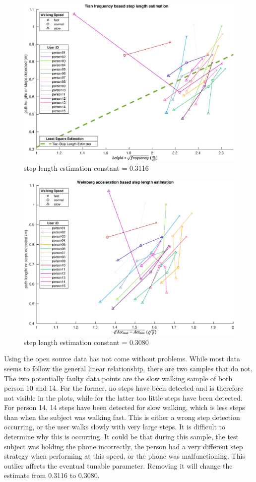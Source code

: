 	\begin{figure}[H]
	\centering
	\includegraphics[width=0.8\linewidth]{images/20201113_1634_tian}
	\caption{step length estimation constant = 0.3116}
	\label{fig:step_length_tian}
	\end{figure}
	\begin{figure}[]
		\centering
		\includegraphics[width=0.8\linewidth]{images/20201113_1639_weinberg}
		\caption{step length estimation constant = 0.3080}
		\label{fig:step_length_weinberg}
	\end{figure}

Using the open source data has not come without problems. While most data seems to follow the general linear relationship, there are two samples that do not. The two potentially faulty data points are the slow walking sample of both person 10 and 14. For the former, no steps have been detected and is therefore not visible in the plots, while for the latter too little steps have been detected. For person 14, 14 steps have been detected for slow walking, which is less steps than when the subject was walking fast. This is either a wrong step detection occurring, or the user walks slowly with very large steps. It is difficult to determine why this is occurring. It could be that during this sample, the test subject was holding the phone incorrectly, the person had a very different step strategy when performing at this speed, or the phone was malfunctioning. This outlier affects the eventual tunable parameter. Removing it will change the estimate from 0.3116 to 0.3080. \par 

